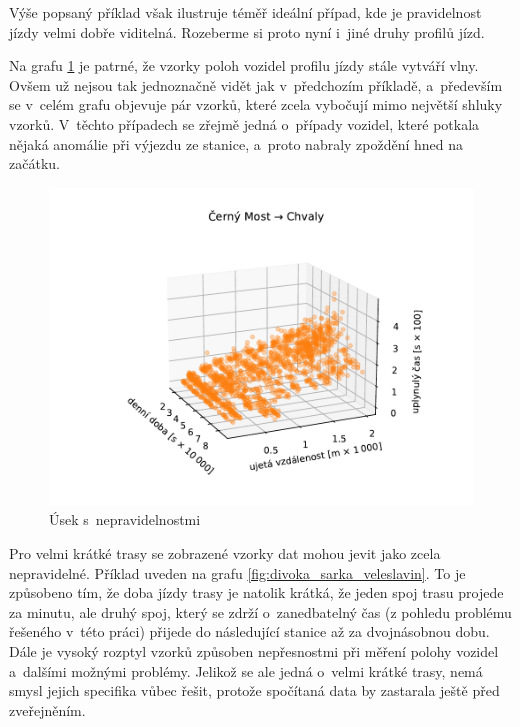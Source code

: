 Výše popsaný příklad však ilustruje téměř ideální případ, kde je pravidelnost jízdy velmi dobře viditelná. Rozeberme si proto nyní i~jiné druhy profilů jízd.


\bigbreak

Na grafu \ref{fig:cerny_most_chvaly} je patrné, že vzorky poloh vozidel profilu jízdy stále vytváří vlny. Ovšem už nejsou tak jednoznačně vidět jak v~předchozím příkladě, a~především se v~celém grafu objevuje pár vzorků, které zcela vybočují mimo největší shluky vzorků. V~těchto případech se zřejmě jedná o~případy vozidel, které potkala nějaká anomálie při výjezdu ze stanice, a~proto nabraly zpoždění hned na začátku.


\begin{figure}
\centering
  \includegraphics[width=\linewidth]{../img/4383_2712}
  \caption{Úsek s~nepravidelnostmi}
  \label{fig:cerny_most_chvaly}
\end{figure}

\bigbreak


Pro velmi krátké trasy se zobrazené vzorky dat mohou jevit jako zcela nepravidelné. Příklad uveden na grafu \ref{fig:divoka_sarka_veleslavin}. To je způsobeno tím, že doba jízdy trasy je natolik krátká, že jeden spoj trasu projede za minutu, ale druhý spoj, který se zdrží o~zanedbatelný čas (z pohledu problému řešeného v~této práci) přijede do následující stanice až za dvojnásobnou dobu. Dále je vysoký rozptyl vzorků způsoben nepřesnostmi při měření polohy vozidel a~dalšími možnými problémy. Jelikož se ale jedná o~velmi krátké trasy, nemá smysl jejich specifika vůbec řešit, protože spočítaná data by zastarala ještě před zveřejněním.


